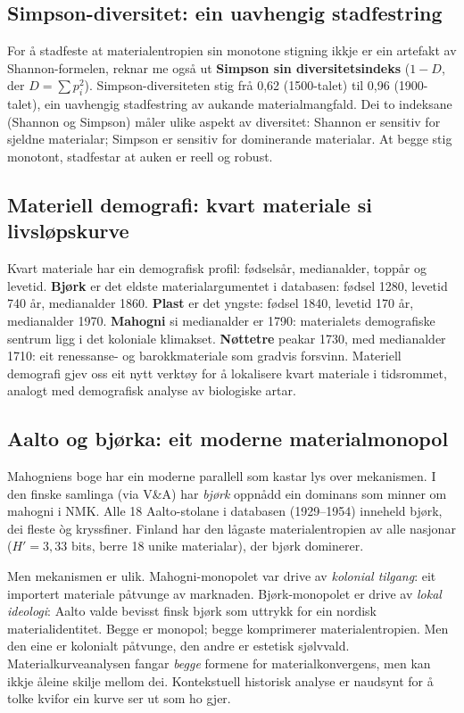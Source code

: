 \documentclass[10pt, a4paper, twocolumn]{article}
\begin{document}
\subsection{Simpson-diversitet: ein uavhengig stadfestring}

For å stadfeste at materialentropien sin monotone stigning ikkje er ein artefakt av Shannon-formelen, reknar me også ut \textbf{Simpson sin diversitetsindeks} ($1 - D$, der $D = \sum p_i^2$). Simpson-diversiteten stig frå 0,62 (1500-talet) til 0,96 (1900-talet), ein uavhengig stadfestring av aukande materialmangfald. Dei to indeksane (Shannon og Simpson) måler ulike aspekt av diversitet: Shannon er sensitiv for sjeldne materialar; Simpson er sensitiv for dominerande materialar. At begge stig monotont, stadfestar at auken er reell og robust.

\subsection{Materiell demografi: kvart materiale si livsløpskurve}

Kvart materiale har ein demografisk profil: fødselsår, medianalder, toppår og levetid. \textbf{Bjørk} er det eldste materialargumentet i databasen: fødsel 1280, levetid 740 år, medianalder 1860. \textbf{Plast} er det yngste: fødsel 1840, levetid 170 år, medianalder 1970. \textbf{Mahogni} si medianalder er 1790: materialets demografiske sentrum ligg i det koloniale klimakset. \textbf{Nøttetre} peakar 1730, med medianalder 1710: eit renessanse- og barokkmateriale som gradvis forsvinn. Materiell demografi gjev oss eit nytt verktøy for å lokalisere kvart materiale i tidsrommet, analogt med demografisk analyse av biologiske artar.

\subsection{Aalto og bjørka: eit moderne materialmonopol}

Mahogniens boge har ein moderne parallell som kastar lys over mekanismen. I den finske samlinga (via V\&A) har \emph{bjørk} oppnådd ein dominans som minner om mahogni i NMK. Alle 18 Aalto-stolane i databasen (1929--1954) inneheld bjørk, dei fleste òg kryssfiner. Finland har den lågaste materialentropien av alle nasjonar ($H' = 3{,}33$ bits, berre 18 unike materialar), der bjørk dominerer.

Men mekanismen er ulik. Mahogni-monopolet var drive av \emph{kolonial tilgang}: eit importert materiale påtvunge av marknaden. Bjørk-monopolet er drive av \emph{lokal ideologi}: Aalto valde bevisst finsk bjørk som uttrykk for ein nordisk materialidentitet. Begge er monopol; begge komprimerer materialentropien. Men den eine er kolonialt påtvunge, den andre er estetisk sjølvvald. Materialkurveanalysen fangar \emph{begge} formene for materialkonvergens, men kan ikkje åleine skilje mellom dei. Kontekstuell historisk analyse er naudsynt for å tolke kvifor ein kurve ser ut som ho gjer.
\end{document}
